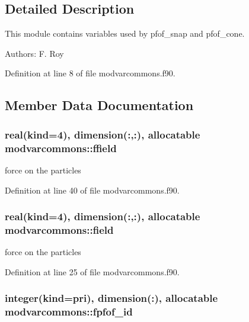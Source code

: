 \subsection{Detailed Description}
This module contains variables used by pfof\-\_\-snap and pfof\-\_\-cone. 

Authors\-: F. Roy 

Definition at line 8 of file modvarcommons.\-f90.



\subsection{Member Data Documentation}
\hypertarget{classmodvarcommons_a715db5dbf29bce0c1dfa4e5b5d681f5a}{
\subsubsection[{ffield}]{\setlength{\rightskip}{0pt plus 5cm}real(kind=4), dimension(\-:,\-:), allocatable modvarcommons\-::ffield}}\label{classmodvarcommons_a715db5dbf29bce0c1dfa4e5b5d681f5a}


force on the particles 



Definition at line 40 of file modvarcommons.\-f90.

\hypertarget{classmodvarcommons_af5bba78d6e056541f1defb808bf62d63}{
\subsubsection[{field}]{\setlength{\rightskip}{0pt plus 5cm}real(kind=4), dimension(\-:,\-:), allocatable modvarcommons\-::field}}\label{classmodvarcommons_af5bba78d6e056541f1defb808bf62d63}


force on the particles 



Definition at line 25 of file modvarcommons.\-f90.

\hypertarget{classmodvarcommons_a8ed131ee0f1bd2a33b132ea270741133}{
\subsubsection[{fpfof\-\_\-id}]{\setlength{\rightskip}{0pt plus 5cm}integer(kind=pri), dimension(\-:), allocatable modvarcommons\-::fpfof\-\_\-id}}\label{classmodvarcommons_a8ed131ee0f1bd2a33b132ea270741133}


